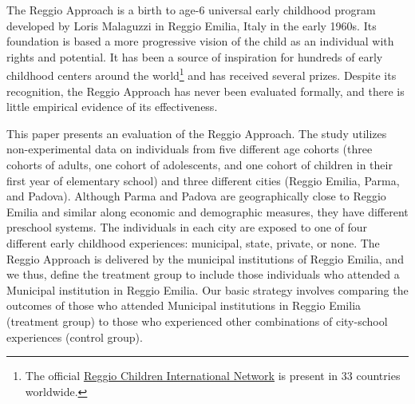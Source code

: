 The Reggio Approach is a birth to age-6 universal early childhood program developed by Loris Malaguzzi in Reggio Emilia, Italy in the early 1960s. Its foundation is based a more progressive vision of the child as an individual with rights and potential. It has been a source of inspiration for hundreds of early childhood centers around the world\footnote{The official \href{http://www.reggiochildren.it/network/?lang=en}{Reggio Children International Network} is present in 33 countries worldwide.} and has received several prizes. Despite its recognition, the Reggio Approach has never been evaluated formally, and there is little empirical evidence of its effectiveness. 

This paper presents an evaluation of the Reggio Approach. The study utilizes non-experimental data on individuals from five different age cohorts (three cohorts of adults, one cohort of adolescents, and one cohort of children in their first year of elementary school) and three different cities (Reggio Emilia, Parma, and Padova). Although Parma and Padova are geographically close to Reggio Emilia and similar along economic and demographic measures, they have different preschool systems. The individuals in each city are exposed to one of four different early childhood experiences: municipal, state, private, or none. The Reggio Approach is delivered by the municipal institutions of Reggio Emilia, and we thus, define the treatment group to include those individuals who attended a Municipal institution in Reggio Emilia. Our basic strategy involves comparing the outcomes of those who attended Municipal institutions in Reggio Emilia (treatment group) to those who experienced other combinations of city-school experiences (control group).

